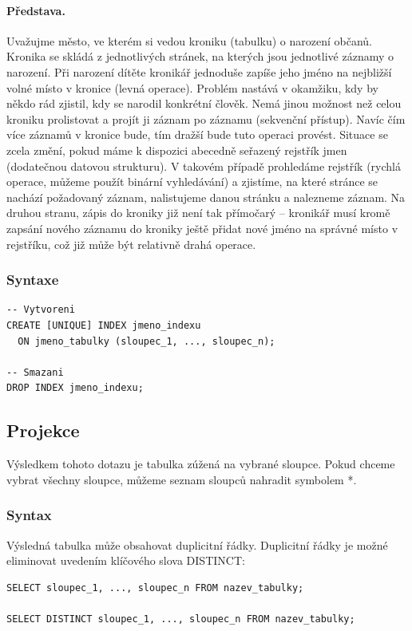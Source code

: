 \documentclass[10pt,a4paper]{article}
\begin{document}
\paragraph{Představa.} 
Uvažujme město, ve kterém si vedou kroniku (tabulku) o narození občanů. Kronika se skládá z jednotlivých stránek, na kterých jsou jednotlivé záznamy o narození. Při narození dítěte kronikář jednoduše zapíše jeho jméno na nejbližší volné místo v kronice (levná operace). Problém nastává v okamžiku, kdy by někdo rád zjistil, kdy se narodil konkrétní člověk. Nemá jinou možnost než celou kroniku prolistovat a projít ji záznam po záznamu (sekvenční přístup). Navíc čím více záznamů v kronice bude, tím dražší bude tuto operaci provést.
Situace se zcela změní, pokud máme k dispozici abecedně seřazený rejstřík jmen (dodatečnou datovou strukturu). V takovém případě prohledáme rejstřík (rychlá operace, můžeme použít binární vyhledávání) a zjistíme, na které stránce se nachází požadovaný záznam, nalistujeme danou stránku a nalezneme záznam. Na druhou stranu, zápis do kroniky již není tak přímočarý – kronikář musí kromě zapsání nového záznamu do kroniky ještě přidat nové jméno na správné místo v rejstříku, což již může být relativně drahá operace.

\newpage
\subsubsection{Syntaxe}
\begin{lstlisting}
-- Vytvoreni
CREATE [UNIQUE] INDEX jmeno_indexu 
  ON jmeno_tabulky (sloupec_1, ..., sloupec_n);

-- Smazani
DROP INDEX jmeno_indexu;
\end{lstlisting}


\subsection{Projekce}
Výsledkem tohoto dotazu je tabulka zúžená na vybrané sloupce. Pokud chceme vybrat všechny sloupce, můžeme seznam sloupců nahradit symbolem *.

\subsubsection{Syntax}
Výsledná tabulka může obsahovat duplicitní řádky. Duplicitní řádky je možné eliminovat uvedením klíčového slova DISTINCT:
\begin{lstlisting}
SELECT sloupec_1, ..., sloupec_n FROM nazev_tabulky;

SELECT DISTINCT sloupec_1, ..., sloupec_n FROM nazev_tabulky;
\end{lstlisting}
\end{document}
